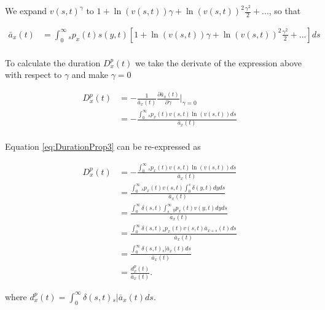 \documentclass[12pt]{article}
\begin{document}
We expand $v(s,t)^{\gamma}$ to $1+\ln(v(s,t)) \gamma+{\ln(v(s,t))}^2 \frac{\gamma^2}{2}+...$, so that


\begin{equation}\label{eq:DurationProp2}
\begin{split}
\bar{a}_x(t) &= \int_0^\infty {}_sp_x(t) s(y,t)[1+\ln(v(s,t)) \gamma+{\ln(v(s,t))}^2 \frac{\gamma^2}{2}+...]ds\\
\end{split}
\end{equation}


To calculate the duration ${D}^{p}_{x}(t)$ we take the derivate of the expression above with respect to $\gamma$ and make $\gamma=0$

\begin{equation}\label{eq:DurationProp3}
\begin{split}
{D}^{p}_{x}(t)&=-\frac{1}{\bar{a}_x(t)}\frac{\partial \bar{a}_x(t)}{\partial \gamma} \bigg\rvert_{\gamma=0} \\
&= -\frac{\int_0^\infty {}_sp_x(t) v(s,t) \ln(v(s,t))ds}{\bar{a}_x(t)} \\
\end{split}
\end{equation}


Equation \ref{eq:DurationProp3} can be re-expressed as 


\begin{equation}\label{eq:DurationProp4}
\begin{split}
{D}^{p}_{x}(t) &= -\frac{\int_0^\infty {}_sp_x(t) v(s,t) \ln(v(s,t))ds}{\bar{a}_x(t)}\\
&= \frac{\int_0^\infty {}_sp_x(t) v(s,t) \int_0^{s} \delta(y,t)dy ds }{\bar{a}_x(t)}\\
&= \frac{\int_0^\infty \delta(s,t)  \int_{s}^{\infty} {}_{y}p_x(t) v(y,t)dy ds }{\bar{a}_x(t)}\\
&= \frac{\int_0^\infty \delta(s,t) {}_sp_x(t) v(s,t) \bar{a}_{x+s}(t)  ds }{\bar{a}_x(t)}\\
&= \frac{\int_0^\infty \delta(s,t) {}_s|\bar{a}_x(t) ds}{\bar{a}_x(t)} \\
&= \frac{{d}^{p}_{x}(t)}{\bar{a}_x(t)}.
\end{split}
\end{equation}



where ${d}^{p}_{x}(t)=\int_0^\infty \delta(s,t) {}_s|\bar{a}_x(t) ds$.
\end{document}
